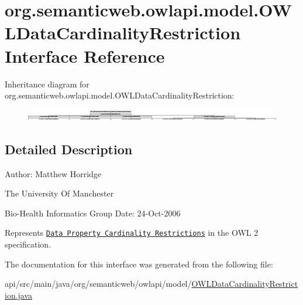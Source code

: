 \hypertarget{interfaceorg_1_1semanticweb_1_1owlapi_1_1model_1_1_o_w_l_data_cardinality_restriction}{\section{org.\-semanticweb.\-owlapi.\-model.\-O\-W\-L\-Data\-Cardinality\-Restriction Interface Reference}
\label{interfaceorg_1_1semanticweb_1_1owlapi_1_1model_1_1_o_w_l_data_cardinality_restriction}
}
Inheritance diagram for org.\-semanticweb.\-owlapi.\-model.\-O\-W\-L\-Data\-Cardinality\-Restriction\-:\begin{figure}[H]
\begin{center}
\leavevmode
\includegraphics[height=0.505187cm]{interfaceorg_1_1semanticweb_1_1owlapi_1_1model_1_1_o_w_l_data_cardinality_restriction}
\end{center}
\end{figure}


\subsection{Detailed Description}
Author\-: Matthew Horridge\par
 The University Of Manchester\par
 Bio-\/\-Health Informatics Group Date\-: 24-\/\-Oct-\/2006 

Represents \href{http://www.w3.org/TR/2009/REC-owl2-syntax-20091027/#Data_Property_Cardinality_Restrictions}{\tt Data Property Cardinality Restrictions} in the O\-W\-L 2 specification. 

The documentation for this interface was generated from the following file\-:\begin{DoxyCompactItemize}
\item 
api/src/main/java/org/semanticweb/owlapi/model/\hyperlink{_o_w_l_data_cardinality_restriction_8java}{O\-W\-L\-Data\-Cardinality\-Restriction.\-java}\end{DoxyCompactItemize}
